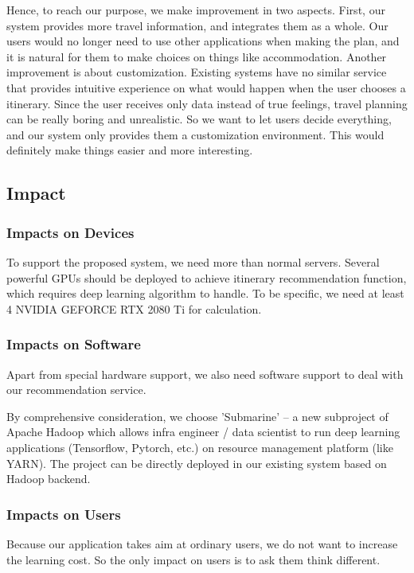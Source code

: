 \documentclass[10pt]{article}
\begin{document}
Hence, to reach our purpose, we make improvement in two aspects. First, our system provides more travel information, and integrates them as a whole. Our users would no longer need to use other applications when making the plan, and it is natural for them to make choices on things like accommodation. Another improvement is about customization. Existing systems have no similar service that provides intuitive experience on what would happen when the user chooses a itinerary. Since the user receives only data instead of true feelings, travel planning can be really boring and unrealistic. So we want to let users decide everything, and our system only provides them a customization environment. This would definitely make things easier and more interesting.

\subsection{Impact}
\subsubsection{Impacts on Devices}
To support the proposed system, we need more than normal servers. Several powerful GPUs should be deployed to achieve itinerary recommendation function, which requires deep learning algorithm to handle. To be specific, we need at least 4 NVIDIA GEFORCE RTX 2080 Ti for calculation.

\subsubsection{Impacts on Software}
Apart from special hardware support, we also need software support to deal with our recommendation service. 

By comprehensive consideration, we choose 'Submarine' -- a new subproject of Apache Hadoop which allows infra engineer / data scientist to run deep learning applications (Tensorflow, Pytorch, etc.) on resource management platform (like YARN). The project can be directly deployed in our existing system based on Hadoop backend.

\subsubsection{Impacts on Users}
Because our application takes aim at ordinary users, we do not want to increase the learning cost. So the only impact on users is to ask them think different.
\end{document}

